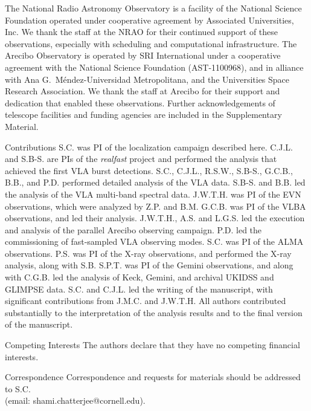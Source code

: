 \documentclass{nature_frb}
\begin{document}
\begin{addendum}

\item The National Radio Astronomy Observatory is a facility of the National Science Foundation operated under cooperative agreement by Associated Universities, Inc.
We thank the staff at the NRAO for their continued support of these observations, especially with scheduling and computational infrastructure.
The Arecibo Observatory is operated by SRI International under a cooperative agreement with the National Science Foundation (AST-1100968), and in alliance with Ana G.~M\'{e}ndez-Universidad Metropolitana, and the Universities Space Research Association.
We thank the staff at Arecibo for their support and dedication that enabled these observations. Further acknowledgements of telescope facilities and funding agencies are included in the Supplementary Material.


\item[Contributions]
S.C. was PI of the localization campaign described here.
C.J.L. and S.B-S. are PIs of the {\em realfast} project and performed the analysis that achieved the first VLA burst detections.
S.C., C.J.L., R.S.W., S.B-S., G.C.B., B.B., and P.D. performed
detailed analysis of the VLA data.
S.B-S. and B.B. led the analysis
of the VLA multi-band spectral data.  J.W.T.H. was PI of the EVN
observations, which were analyzed by Z.P. and B.M. G.C.B. was PI of
the VLBA observations, and led their analysis.  J.W.T.H., A.S. and
L.G.S. led the execution and analysis of the parallel Arecibo observing
campaign. P.D. led the commissioning of fast-sampled VLA observing modes.
S.C. was PI of the ALMA observations.
P.S. was PI of the X-ray observations, and
performed the X-ray analysis, along with S.B.
S.P.T. was PI of the Gemini observations, and
along with C.G.B. led the analysis of Keck, Gemini, and
archival UKIDSS and GLIMPSE data. S.C. and
C.J.L. led the writing of the manuscript, with significant
contributions from J.M.C. and J.W.T.H.  All authors
contributed substantially to the interpretation of the analysis
results and to the final version of the manuscript.

\item[Competing Interests] The authors declare that they have no
  competing financial interests.

\item[Correspondence] Correspondence and requests for materials should
  be addressed to S.C.\\
  (email: shami.chatterjee@cornell.edu).

\end{addendum}
\end{document}
